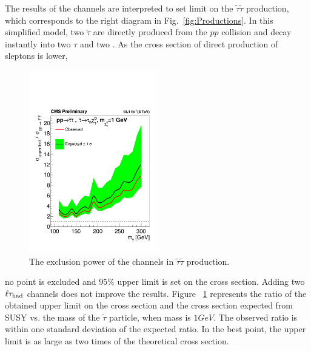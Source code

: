 The results of the \tauTau channels are interpreted to set limit on the $\tilde{\tau}\tilde{\tau}$ production, which corresponds to the right diagram in Fig.~\ref{fig:Productions}. In this simplified model, two $\tilde{\tau}$ are directly produced from the $pp$ collision and decay instantly into two $\tau$ and two \PSGczDo. As the cross section of direct production of sleptons is lower,
\begin{linenomath}
\begin{figure}[h]
\centering
\includegraphics[width=0.5\textwidth,keepaspectratio=true]{StatisticsFig/ExclusionSTauSTauLsp1.pdf}
\caption{The exclusion power of the \tauTau channels in $\tilde{\tau}\tilde{\tau}$ production.}
\label{fig:limit_stau_stau}
\end{figure}
\end{linenomath}
 no point is excluded and $95\%$ upper limit is set on the cross section. Adding two $\ell\tau_{\rm had}$ channels does not improve the results.
Figure ~\ref{fig:limit_stau_stau} represents the ratio of the 
obtained upper limit on the cross section and the cross section expected from SUSY vs. the mass of the $\tilde{\tau}$ particle, when \PSGczDo mass is $1 GeV$.
The observed ratio is within one standard deviation of  the expected ratio. In the best point,  the upper limit is as large as two times of the theoretical 
cross section. 





